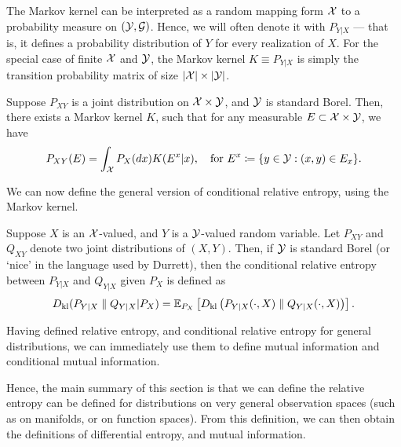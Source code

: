         \begin{remark}
            The Markov kernel can be interpreted as a random mapping form $\mathcal{X}$ to a probability measure on $(\mathcal{Y}, \mathcal{G})$. Hence, we will often denote it with $P_{Y|X}$ --- that is, it defines a probability distribution of $Y$ for every realization of $X$.  For the special case of finite $\mathcal{X}$ and $\mathcal{Y}$,  the Markov kernel $K \equiv P_{Y|X}$ is simply the  transition probability matrix of size $|\mathcal{X}|\times |\mathcal{Y}|$. 
        \end{remark}

        \begin{fact}
            \label{fact:disintegration-theorem}
            Suppose $P_{XY}$ is a joint distribution on $\mathcal{X} \times \mathcal{Y}$, and $\mathcal{Y}$ is standard Borel. Then, there exists a Markov kernel $K$, such that for any measurable $E \subset \mathcal{X} \times \mathcal{Y}$, we have 
            \begin{align}
                P_{XY}(E) = \int_{\mathcal{X}}P_X(dx) K(E^x|x), \quad \text{for } E^x \coloneqq \{y \in \mathcal{Y}: (x,y) \in E_x\}. 
            \end{align}
        \end{fact}

        We can now define the general version of conditional relative entropy, using the Markov kernel. 
        \begin{definition}
            \label{def:cond-rel-ent-general} Suppose $X$ is an $\mathcal{X}$-valued, and $Y$ is a $\mathcal{Y}$-valued random variable. Let $P_{XY}$ and $Q_{XY}$ denote two joint distributions of $(X, Y)$. Then, if $\mathcal{Y}$ is standard Borel (or `nice' in the language used by Durrett), then the conditional relative entropy between $P_{Y|X}$ and $Q_{Y|X}$ given $P_X$ is defined as 
            \begin{align}
                D_{\text{kl}}(P_{Y|X} \parallel Q_{Y|X} | P_X) = \mathbb{E}_{P_X}\left[ D_{\text{kl}}\left( P_{Y|X}(\cdot, X) \parallel Q_{Y|X}(\cdot, X) \right) \right]. 
            \end{align}
        \end{definition}

        \begin{remark}
            Having defined relative entropy, and conditional relative entropy for general distributions, we can immediately use them to define mutual information and conditional mutual information. 
        \end{remark}

        Hence, the main summary of this section is that we can define the relative entropy can be defined for distributions on very general observation spaces (such as on manifolds, or on function spaces). From this definition, we can then obtain the definitions of differential entropy, and mutual information. 

